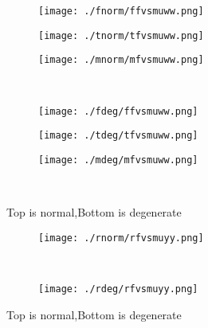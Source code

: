 \documentclass[aps,floats,floatfix,nofootinbib]{revtex4-1}
\begin{document}
\begin{center}
\begin{figure}
\begin{subfigure}{0.3\textwidth}
\texttt{[image: ./fnorm/ffvsmuww.png]}
\label{}
\end{subfigure}
\begin{subfigure}{0.3\textwidth}
\texttt{[image: ./tnorm/tfvsmuww.png]}
\label{}
\end{subfigure}
\begin{subfigure}{0.3\textwidth}
\texttt{[image: ./mnorm/mfvsmuww.png]}
\label{}
\end{subfigure}\\
\begin{subfigure}{0.3\textwidth}
\texttt{[image: ./fdeg/ffvsmuww.png]}
\label{}
\end{subfigure}
\begin{subfigure}{0.3\textwidth}
\texttt{[image: ./tdeg/tfvsmuww.png]}
\label{}
\end{subfigure}
\begin{subfigure}{0.3\textwidth}
\texttt{[image: ./mdeg/mfvsmuww.png]}
\label{}
\end{subfigure}\\
\caption{Top is normal,Bottom is degenerate}
\end{figure}
\end{center}

\begin{center}
\begin{figure}
\begin{subfigure}{0.95\textwidth}
\texttt{[image: ./rnorm/rfvsmuyy.png]}
\label{}
\end{subfigure}\\
\begin{subfigure}{0.95\textwidth}
\texttt{[image: ./rdeg/rfvsmuyy.png]}
\label{}
\end{subfigure}
\caption{Top is normal,Bottom is degenerate}
\end{figure}
\end{center}
\end{document}
